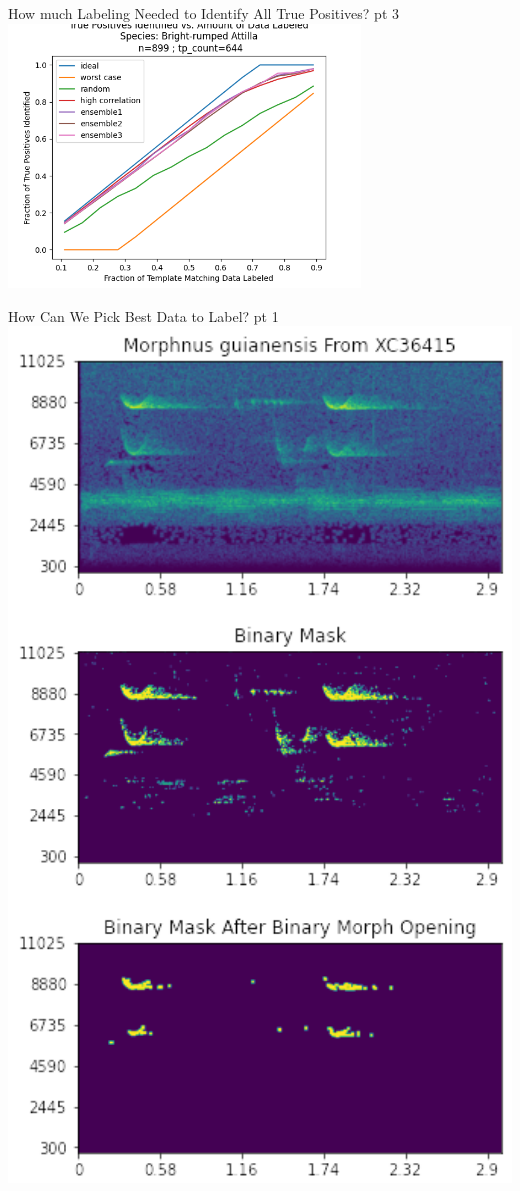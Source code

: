 \begin{frame}{How much Labeling Needed to Identify All True Positives? pt 3}
    \centering
    \includegraphics[height=0.7\textheight,width=0.7\textwidth,keepaspectratio]{images/aid/attilla.png}
\end{frame}

\begin{frame}{How Can We Pick Best Data to Label? pt 1}
    \centering
    \includegraphics[height=1\textheight,width=1\textwidth,keepaspectratio]{images/aid/paper.png}
\end{frame}

